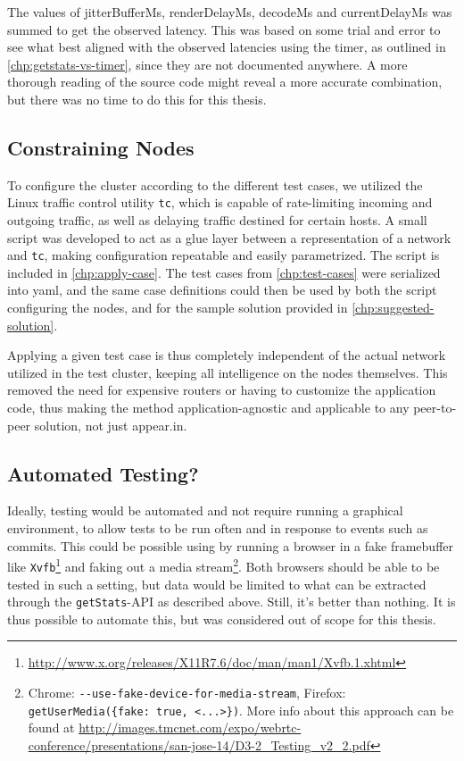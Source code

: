 The values of jitterBufferMs, renderDelayMs, decodeMs and currentDelayMs was summed to get the observed latency. This was based on some trial and error to see what best aligned with the observed latencies using the timer, as outlined in \autoref{chp:getstats-vs-timer}, since they are not documented anywhere. A more thorough reading of the source code might reveal a more accurate combination, but there was no time to do this for this thesis.


\subsection{Constraining Nodes}

To configure the cluster according to the different test cases, we utilized the Linux traffic control utility \texttt{tc}, which is capable of rate-limiting incoming and outgoing traffic, as well as delaying traffic destined for certain hosts. A small script was developed to act as a glue layer between a representation of a network and \texttt{tc}, making configuration repeatable and easily parametrized. The script is included in \autoref{chp:apply-case}. The test cases from \autoref{chp:test-cases} were serialized into \gls{yaml}, and the same case definitions could then be used by both the script configuring the nodes, and for the sample solution provided in \autoref{chp:suggested-solution}.

Applying a given test case is thus completely independent of the actual network utilized in the test cluster, keeping all intelligence on the nodes themselves. This removed the need for expensive routers or having to customize the application code, thus making the method application-agnostic and applicable to any peer-to-peer solution, not just appear.in.


\subsection{Automated Testing?}\label{subsec:automated-testing}

Ideally, testing would be automated and not require running a graphical environment, to allow tests to be run often and in response to events such as commits. This could be possible using by running a browser in a fake framebuffer like \texttt{Xvfb}\footnote{\url{http://www.x.org/releases/X11R7.6/doc/man/man1/Xvfb.1.xhtml}} and faking out a media stream\footnote{Chrome: \texttt{-{}-use-fake-device-for-media-stream}, Firefox: \texttt{getUserMedia(\{fake: true, <...>\})}. More info about this approach can be found at \url{http://images.tmcnet.com/expo/webrtc-conference/presentations/san-jose-14/D3-2_Testing_v2_2.pdf}}. Both browsers should be able to be tested in such a setting, but data would be limited to what can be extracted through the \texttt{getStats}-API as described above. Still, it's better than nothing. It is thus possible to automate this, but was considered out of scope for this thesis.

